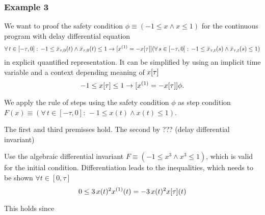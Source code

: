 \documentclass[10pt]{report}
\begin{document}
            \subsubsection{Example 3}
                \label{sec:ddi-example-3}

                We want to proof the safety condition $\phi\equiv(-1\leq x\wedge x\leq 1)$ for the continuous program with delay differential equation
                \begin{equation}
                    \forall\,t\in[-\tau,0]:\,-1\leq\xbartaut{0}(t)\wedge\xbartaut{0}(t)\leq 1
                    \rightarrow
                    [\D{x}=-\xtau] (\forall\,s\in[-\tau,0]:\,-1\leq\xbartaut{t}(s)\wedge\xbartaut{t}(s)\leq 1)
                \end{equation}
                in explicit quantified representation. It can be simplified by using an implicit time variable and a context depending meaning of $x[\tau]$
                \begin{equation}
                    -1\leq\xtau\leq 1 \rightarrow [\D{x}=-\xtau]\phi.
                \end{equation}

                We apply the rule of steps using the safety condition $\phi$ as step condition $F(x)\equiv(\forall\,t\in[-\tau,0]:\,-1\leq x(t)\wedge x(t)\leq 1)$.

                The first and third premisses hold. The second by ??? (delay differential invariant)

                Use the algebraic differential invariant $F\equiv(-1\leq x^3\wedge x^3\leq1)$, which is valid for the initial condition. Differentiation leads to the inequalities, which needs to be shown $\forall t\in[0,\tau]$
                \begin{equation}
                    0\leq 3\,x(t)^2 \D{x}(t) = -3\,x(t)^2 \xtau(t)
                \end{equation}

                This holds since



\nocite{*}


\end{document}
